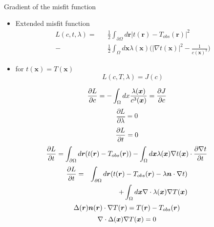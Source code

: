 \documentclass{beamer}
\begin{document}
 \begin{frame}{Gradient of the misfit function}
  
  \begin{itemize}
   \item Extended misfit function
   \begin{eqnarray}
    L({c},t,\lambda) = &&\frac{1}{2}\int_{\partial\Omega}d\boldsymbol{r}|t(\boldsymbol{r}) - T_{obs}(\boldsymbol{r})|^2 \nonumber \\
    - &&\frac{1}{2}\int_\Omega d\boldsymbol{x}\lambda(\boldsymbol{x})\bigg(|\nabla t(\boldsymbol{x})|^2 - \frac{1}{{c}(\boldsymbol{x})^2}\bigg)
   \end{eqnarray}

   \item for $t(\boldsymbol{x}) = T(\boldsymbol{x})$
   \begin{equation}
    L({c},T,\lambda) = J({c})
   \end{equation}
   
  \end{itemize}

  
 \end{frame}


\begin{frame}
	\begin{equation}
\frac{\partial L}{\partial c} = - \int_{\Omega} dx\frac{\lambda(\vc{x})}{c^3(\vc{x})} =  \frac{\partial J}{\partial c}
	\end{equation}
	\begin{equation}
	\frac{\partial L}{\partial \lambda} = 0
	\end{equation}
	\begin{equation}
	\ddt[L] = 0
	\end{equation}
	\begin{equation}
	\frac{\partial L}{\partial t} =\int_{\partial\Omega} d\boldsymbol{r}(t(\boldsymbol{r}) - T_{obs}(\boldsymbol{r})) -
	\int_{\Omega}d\vc{x}\lambda(\vc{x})\nabla  t(\vc{x}) \cdot \ddt[\nabla t]
	\end{equation}
	\begin{eqnarray}
		\frac{\partial L}{\partial t}& =  & \int_{\partial\Omega} d\boldsymbol{r}(t(\boldsymbol{r}) - T_{obs}(\boldsymbol{r}) - \lambda \vc{n} \cdot \nabla t) \nonumber \\
		&& + \int_{\Omega} d\vc{x}\nabla \cdot \lambda(\vc{x})\nabla T(\vc{x})
	\end{eqnarray}
	\begin{equation}
	\Delta(\vc{r})\vc{n}(\vc{r}) \cdot  \nabla T(\vc{r}) = T(\vc{r})  - T_{obs}(\vc{r})
	\end{equation}
	\begin{equation}
	\nabla \cdot \Delta(\vc{x})\nabla T(\vc{x}) = 0
	\end{equation}
	
	
\end{frame}
\end{document}
